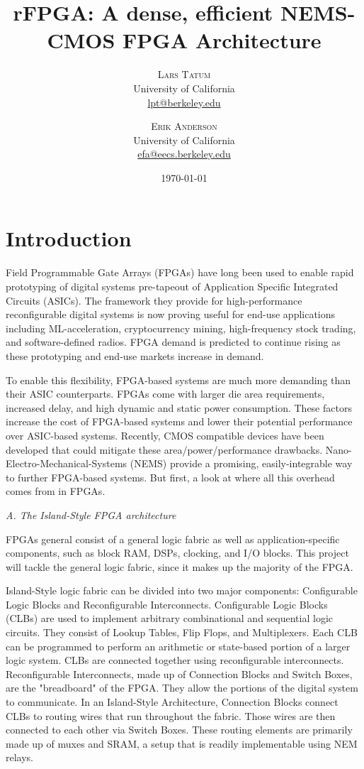 \documentclass[twoside,twocolumn]{article}
\title{rFPGA: A dense, efficient NEMS-CMOS FPGA Architecture} %
\author{%
\textsc{Lars Tatum}\\[1ex] %
\normalsize University of California \\ %
\normalsize \href{mailto:lpt@berkeley.edu}{lpt@berkeley.edu} %
\and %
\textsc{Erik Anderson}\\[1ex] %
\normalsize University of California \\ %
\normalsize \href{mailto:efa@eecs.berkeley.edu}{efa@eecs.berkeley.edu} %
}
\date{\today} %
\begin{document}
\maketitle


\section{Introduction}
Field Programmable Gate Arrays (FPGAs) have long been used to enable rapid prototyping of digital systems pre-tapeout of Application Specific Integrated Circuits (ASICs)\cite{8187326}. The framework they provide for high-performance reconfigurable digital systems is now proving useful for end-use applications including ML-acceleration, cryptocurrency mining, high-frequency stock trading, and software-defined radios. FPGA demand is predicted to continue rising as these prototyping and end-use markets increase in demand.

To enable this flexibility, FPGA-based systems are much more demanding than their ASIC counterparts. FPGAs come with larger die area requirements, increased delay, and high dynamic and static power consumption. These factors increase the cost of FPGA-based systems and lower their potential performance over ASIC-based systems. Recently, CMOS compatible devices have been developed that could mitigate these area/power/performance drawbacks.  Nano-Electro-Mechanical-Systems (NEMS) provide a promising, easily-integrable way to further FPGA-based systems. But first, a look at where all this overhead comes from in FPGAs.

\textit{A. The Island-Style FPGA architecture}

FPGAs general consist of a general logic fabric as well as application-specific components, such as block RAM, DSPs, clocking, and I/O blocks\cite{8187326}. This project will tackle the general logic fabric, since it makes up the majority of the FPGA.

Island-Style logic fabric can be divided into two major components: Configurable Logic Blocks and Reconfigurable Interconnects. Configurable Logic Blocks (CLBs) are used to implement arbitrary combinational and sequential logic circuits. They consist of Lookup Tables, Flip Flops, and Multiplexers. Each CLB can be programmed to perform an arithmetic or state-based portion of a larger logic system. CLBs are connected together using reconfigurable interconnects. Reconfigurable Interconnects, made up of Connection Blocks and Switch Boxes, are the "breadboard" of the FPGA. They allow the portions of the digital system to communicate. In an Island-Style Architecture, Connection Blocks connect CLBs to routing wires that run throughout the fabric. Those wires are then connected to each other via Switch Boxes. These routing elements are primarily made up of muxes and SRAM, a setup that is readily implementable using NEM relays.
\end{document}
